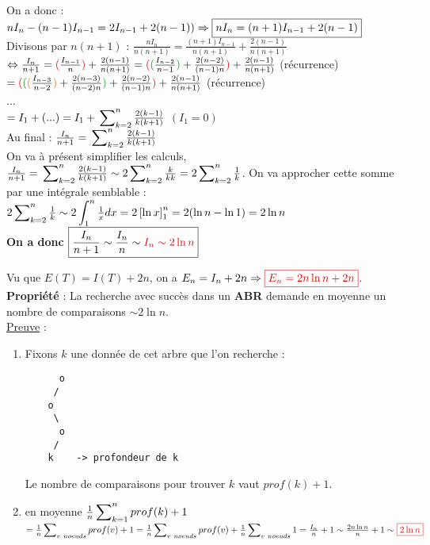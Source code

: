 \documentclass{article}
\newcommand{\gre}[1]{\textcolor{darkgreen}{#1}}
\newcommand{\ora}[1]{\textcolor{darko}{#1}}
\newcommand{\red}[1]{\textcolor{darkred}{#1}}
\newcommand{\sumparam}[3]{\sideset{}{_{#1}^{#2}}\sum{#3}}
\newcommand{\sumkn}[3]{\sideset{}{_{k=#1}^{#2}}\sum{#3}}
\newcommand{\intin}[3]{\sideset{}{_{#1}^{#2}}\int{#3}}
\begin{document}
\noindent On a donc : $nI_n-(n-1)I_{n-1} = 2 I_{n-1} + 2(n-1)) \Rightarrow \boxed{nI_n = (n+1) I_{n-1} + 
2(n-1)}\\$
Divisons par $n(n+1)$ : $\frac{nI_n}{n(n+1)} = \frac{(n+1)I_{n-1}}{n(n+1)} + \frac{2(n-1)}{n(n+1)}$ \\
$\Leftrightarrow \frac{I_n}{n+1} = \red{(}\frac{I_{n-1}}{n}\red{)} + \frac{2(n-1)}{n(n+1)} \\
= \red{(}\gre{(}\frac{I_{n-2}}{n-1}\gre{)} + \frac{2(n-2)}{(n-1)n}\red{)} + \frac{2(n-1)}{n(n+1)}$ (récurrence)\\
$= \red{(}\gre{(}\ora{(}\frac{I_{n-3}}{n-2}\ora{)} + \frac{2(n-3)}{(n-2)n}\gre{)} + \frac{2(n-2)}{(n-1)n}\red{)} 
+ \frac{2(n-1)}{n(n+1)}$ (récurrence) \\
... \\
$ = I_1 + (...) \\
= I_1 + \sumkn{2}{n}{\frac{2(k-1)}{k(k+1)}}$ $(I_1 = 0)$\\

\noindent Au final : $\frac{I_n}{n+1} = \sumkn{2}{n}{\frac{2(k-1)}{k(k+1)}}$\\
On va à présent simplifier les calculs, $\frac{I_n}{n+1} = \sumkn{2}{n}{\frac{2(k-1)}{k(k+1)}} \sim 2 \sumkn{2}
{n}{\frac{k}{kk}} = 2 \sumkn{2}{n}{\frac{1}{k}}$.
On va approcher cette somme par une intégrale semblable : \\
$2 \sumkn{2}{n}{\frac{1}{k}} \sim 2 \intin{1}{n}{\frac{1}{x} dx} = 2 \left[\ln x\right]_1^n = 2(\ln n -\ln 1) = 
2\ln n$ \\

\noindent \textbf{On a donc $\boxed{\frac{I_n}{n+1} \sim \frac{I_n}{n} \sim \red{I_n \sim 2 \ln n}}$}

Vu que $E(T) = I(T) + 2n$, on a $E_n = I_n + 2n \Rightarrow \red{\boxed{E_n = 2n \ln n + 2n}}$. \\

\noindent\textbf{Propriété} : La recherche avec succès dans un \textbf{ABR} demande en moyenne un nombre de 
comparaisons $\sim 2\ln n$. \\
\underline{Preuve} : 
\begin{enumerate}
\item Fixons $k$ une donnée de cet arbre que l'on recherche : \\
\begin{lstlisting}
      o
     /
    o
     \
      o
     /
    k    -> profondeur de k
\end{lstlisting}

Le nombre de comparaisons pour trouver $k$ vaut $prof(k)+1$.
\item en moyenne $\frac{1}{n} \sumkn{1}{n}{prof(k)+1}$ \\
$ = \frac{1}{n} \sumparam{v\ noeuds}{}{prof(v)+1} \\
= \frac{1}{n} \sumparam{v\ noeuds}{}{prof(v)} + \frac{1}{n}\sumparam{v\ noeuds}{}{1} \\
= \frac{I_n}{n} + 1 \\
\sim \frac{2n \ln n}{n} + 1 \\
\sim \red{\boxed{2 \ln{n}}}$
\end{enumerate}
\end{document}
